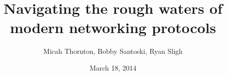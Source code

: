 \title{Navigating the rough waters of modern networking protocols}
\date{March 18, 2014}
\author{Micah Thornton, Bobby Santoski, Ryan Sligh}

\maketitle
